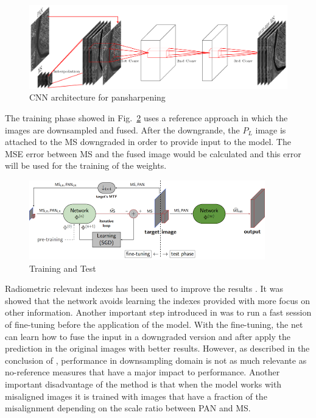 \documentclass[12pt]{report}
\begin{document}
\begin{figure}[t]
    \centering
    \includegraphics[scale=.8]{dl-pnn.png}
    \caption{CNN architecture for pansharpening\cite{pnn}}
    \label{fig:dl-pnn}
\end{figure}

The training phase showed in Fig.~\ref{fig:pnn-training} uses a reference approach in which the images are downsampled and fused. 
After the downgrande, the $P_L$ image is attached to the MS downgraded in order to provide input to the model.
The MSE error between MS and the fused image would be calculated and this error will be used for the training of the weights.

\begin{figure}[t]
    \centering
    \includegraphics[scale=.9]{pnn-training.png}
    \caption{Training and Test\cite{pnn2}}
    \label{fig:pnn-training}
\end{figure}

Radiometric relevant indexes has been used to improve the results \cite{pnn}. 
It was showed that the network avoids learning the indexes provided with more focus on other information.
Another important step introduced in \cite{pnn2} was to run a fast session of fine-tuning before the 
application of the model.
With the fine-tuning, the net can learn how to fuse the input in a downgraded version
and after apply the prediction in the original images with better results.
However, as described in the conclusion of \cite{pnn2}, performance in downsampling domain is
not as much relevante as no-reference measures that have a major impact to performance.
Another important disadvantage of the method is that when the model works with misaligned images 
it is trained with images that have a fraction of the misalignment depending on the scale ratio between PAN and MS. 
\end{document}
